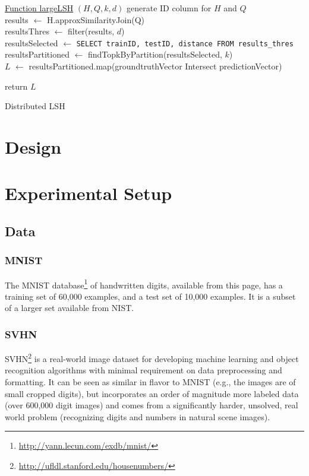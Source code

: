 \documentclass[letterpaper,twocolumn,10pt]{article}
\theoremstyle{definition}
\begin{document}
\begin{algorithm}
	\underline{Function largeLSH} $(H, Q, k, d)$\;
	generate ID column for $H$ and $Q$ \\
	results $\leftarrow$ H.approxSimilarityJoin(Q)   \\
	resultsThres $\leftarrow$ filter(results, $d$) \\
	resultsSelected $\leftarrow$ \texttt{SELECT trainID, testID, distance FROM results\_thres} \\
	resultsPartitioned $\leftarrow$  findTopkByPartition(resultsSelected, $k$) \\
	$L$ $\leftarrow$ resultsPartitioned.map(groundtruthVector Intersect predictionVector)
	
	return $L$\;

	\caption{Distributed LSH}
	\label{knn}
\end{algorithm}

\section{Design}

\section{Experimental Setup}



\subsection{Data}
\subsubsection{MNIST}
The MNIST database\footnote{\url{http://yann.lecun.com/exdb/mnist/}} of handwritten digits, available from this page, has a training set of 60,000 examples, and a test set of 10,000 examples. It is a subset of a larger set available from NIST. 

\subsubsection{SVHN}
SVHN\footnote{\url{http://ufldl.stanford.edu/housenumbers/}} is a real-world image dataset for developing machine learning and object recognition algorithms with minimal requirement on data preprocessing and formatting. It can be seen as similar in flavor to MNIST (e.g., the images are of small cropped digits), but incorporates an order of magnitude more labeled data (over 600,000 digit images) and comes from a significantly harder, unsolved, real world problem (recognizing digits and numbers in natural scene images). 
\end{document}

